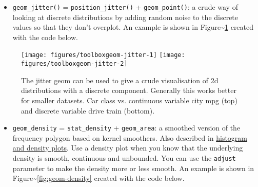 \begin{itemize}
\itemsep1pt\parskip0pt
\item
  \texttt{geom\_jitter()} = \texttt{position\_jitter()} +
  \texttt{geom\_point()}: a crude way of looking at discrete
  distributions by adding random noise to the discrete values so that
  they don't overplot. An example is shown in
  Figure\textasciitilde{}\ref{fig:geom-jitter} created with the code
  below.   
\end{itemize}

\begin{Shaded}
\begin{Highlighting}[]
\NormalTok{)}
\NormalTok{)}
\end{Highlighting}
\end{Shaded}

\begin{figure}
\texttt{[image: figures/toolboxgeom-jitter-1]} \texttt{[image: figures/toolboxgeom-jitter-2]} \caption{The jitter geom can be used to give a crude visualisation of 2d distributions with a discrete component. Generally this works better for smaller datasets. Car class vs. continuous variable city mpg (top) and discrete variable drive train (bottom).\label{fig:geom-jitter}}
\end{figure}

\begin{itemize}
\itemsep1pt\parskip0pt
\item
  \texttt{geom\_density} = \texttt{stat\_density} + \texttt{geom\_area}:
  a smoothed version of the frequency polygon based on kernel smoothers.
  Also described in \hyperref[sub:distribution]{histogram and density
  plots}. Use a density plot when you know that the underlying density
  is smooth, continuous and unbounded. You can use the \texttt{adjust}
  parameter to make the density more or less smooth. An example is shown
  in Figure\textasciitilde{}\ref{fig:geom-density} created with the code
  below.  
   
\end{itemize}

